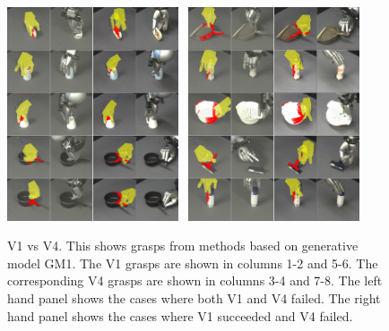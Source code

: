 \begin{figure}
\begin{center}
\includegraphics[width=0.45\textwidth]{plots/A2fA9f_vertical.png}~
\includegraphics[width=0.45\textwidth]{plots/A2sA9f_vertical.png}
\caption{V1 vs V4. This shows grasps from methods based on generative model GM1. The V1 grasps are shown in columns 1-2 and 5-6. The corresponding V4 grasps are shown in columns 3-4 and 7-8. The left hand panel shows the cases where both V1 and V4 failed. The right hand panel shows the cases where V1 succeeded and V4 failed. \label{fig:v1fsv4f}}
\end{center}
\end{figure}


%
